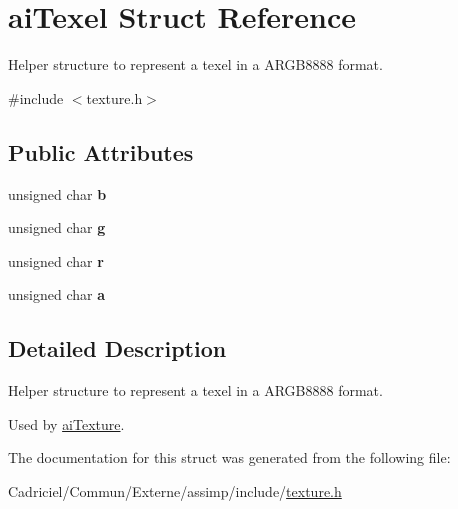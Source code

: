 \hypertarget{structai_texel}{}\section{ai\+Texel Struct Reference}
\label{structai_texel}


Helper structure to represent a texel in a A\+R\+G\+B8888 format.  




{\ttfamily \#include $<$texture.\+h$>$}

\subsection*{Public Attributes}
\begin{DoxyCompactItemize}
\item 
unsigned char {\bfseries b}\hypertarget{structai_texel_a5b4f97f69cf59cb9065af67389599ba6}{}\label{structai_texel_a5b4f97f69cf59cb9065af67389599ba6}

\item 
unsigned char {\bfseries g}\hypertarget{structai_texel_a41da3516b8241165e4ca58ea8ed68fe6}{}\label{structai_texel_a41da3516b8241165e4ca58ea8ed68fe6}

\item 
unsigned char {\bfseries r}\hypertarget{structai_texel_ae9408c0d18f6ff597715cc626398a0ff}{}\label{structai_texel_ae9408c0d18f6ff597715cc626398a0ff}

\item 
unsigned char {\bfseries a}\hypertarget{structai_texel_a6d4450e83b02b29d24f7aab27958034e}{}\label{structai_texel_a6d4450e83b02b29d24f7aab27958034e}

\end{DoxyCompactItemize}


\subsection{Detailed Description}
Helper structure to represent a texel in a A\+R\+G\+B8888 format. 

Used by \hyperlink{structai_texture}{ai\+Texture}. 

The documentation for this struct was generated from the following file\+:\begin{DoxyCompactItemize}
\item 
Cadriciel/\+Commun/\+Externe/assimp/include/\hyperlink{texture_8h}{texture.\+h}\end{DoxyCompactItemize}
